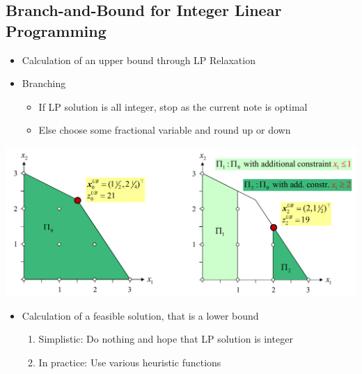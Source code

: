 \documentclass[11pt]{article}
\begin{document}
\subsection{Branch-and-Bound for Integer Linear Programming}
\begin{itemize}
	\item Calculation of an upper bound through LP Relaxation
	\item Branching
	\begin{itemize}
		\item If LP solution is all integer, stop as the current note is optimal
		\item Else choose some fractional variable and round up or down
	\end{itemize}
\end{itemize}
\begin{center}
	\includegraphics[width=0.8\linewidth]{branch_and_bound_ILP}
\end{center}
\begin{itemize}
	\item Calculation of a feasible solution, that is a lower bound
	\begin{enumerate}[label=\roman*.]
		\item Simplistic: Do nothing and hope that LP solution is integer
		\item In practice: Use various heuristic functions
	\end{enumerate}
\end{itemize}
\end{document}
